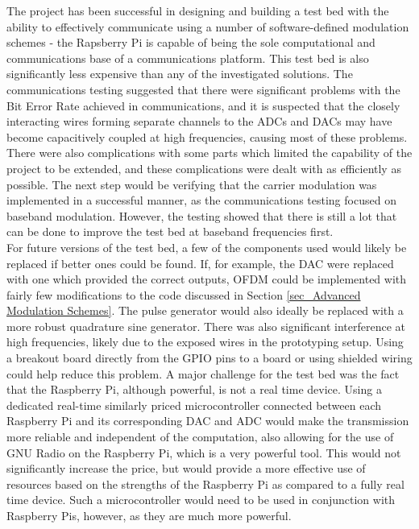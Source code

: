 \documentclass[../main.tex]{subfiles}
\begin{document}
The project has been successful in designing and building a test bed with the ability to effectively communicate using a number of software-defined modulation schemes - the Rapsberry Pi is capable of being the sole computational and communications base of a communications platform.
This test bed is also significantly less expensive than any of the investigated solutions.
The communications testing suggested that there were significant problems with the Bit Error Rate achieved in communications, and it is suspected that the closely interacting wires forming separate channels to the ADCs and DACs may have become capacitively coupled at high frequencies, causing most of these problems.
There were also complications with some parts which limited the capability of the project to be extended, and these complications were dealt with as efficiently as possible.
The next step would be verifying that the carrier modulation was implemented in a successful manner, as the communications testing focused on baseband modulation.
However, the testing showed that there is still a lot that can be done to improve the test bed at baseband frequencies first.\\

For future versions of the test bed, a few of the components used would likely be replaced if better ones could be found.
If, for example, the DAC were replaced with one which provided the correct outputs, OFDM could be implemented with fairly few modifications to the code discussed in Section \ref{sec_Advanced Modulation Schemes}.
The pulse generator would also ideally be replaced with a more robust quadrature sine generator.
There was also significant interference at high frequencies, likely due to the exposed wires in the prototyping setup.
Using a breakout board directly from the GPIO pins to a board or using shielded wiring could help reduce this problem.
A major challenge for the test bed was the fact that the Raspberry Pi, although powerful, is not a real time device.
Using a dedicated real-time similarly priced microcontroller connected between each Raspberry Pi and its corresponding DAC and ADC would make the transmission more reliable and independent of the computation, also allowing for the use of GNU Radio on the Raspberry Pi, which is a very powerful tool.
This would not significantly increase the price, but would provide a more effective use of resources based on the strengths of the Raspberry Pi as compared to a fully real time device.
Such a microcontroller would need to be used in conjunction with Raspberry Pis, however, as they are much more powerful.

\end{document}
